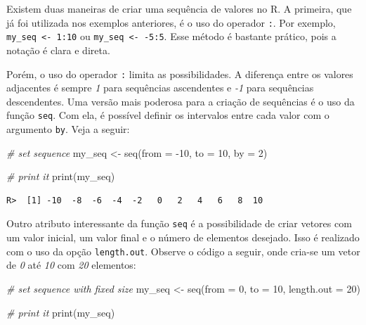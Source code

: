 \documentclass[
  11pt,
]{book}
\newenvironment{Shaded}{\begin{snugshade}}{\end{snugshade}}
\newcommand{\AttributeTok}[1]{\textcolor[rgb]{0.61,0.61,0.61}{#1}}
\newcommand{\CommentTok}[1]{\textcolor[rgb]{0.37,0.37,0.37}{\textit{#1}}}
\newcommand{\DecValTok}[1]{\textcolor[rgb]{0.06,0.06,0.06}{#1}}
\newcommand{\FunctionTok}[1]{\textcolor[rgb]{0,0,0}{#1}}
\newcommand{\NormalTok}[1]{#1}
\newcommand{\OtherTok}[1]{\textcolor[rgb]{0.37,0.37,0.37}{#1}}
\newcommand{\SpecialCharTok}[1]{\textcolor[rgb]{0,0,0}{#1}}
\begin{document}
Existem duas maneiras de criar uma sequência de valores no R. A primeira, que já foi utilizada nos exemplos anteriores, é o uso do operador \texttt{:}. Por exemplo, \texttt{my\_seq\ \textless{}-\ 1:10} ou \texttt{my\_seq\ \textless{}-\ -5:5}. Esse método é bastante prático, pois a notação é clara e direta.

Porém, o uso do operador \texttt{:} limita as possibilidades. A diferença entre os valores adjacentes é sempre \emph{1} para sequências ascendentes e \emph{-1} para sequências descendentes. Uma versão mais poderosa para a criação de sequências é o uso da função \texttt{seq}. Com ela, é possível definir os intervalos entre cada valor com o argumento \texttt{by}. Veja a seguir: 

\begin{Shaded}
\begin{Highlighting}[]
\CommentTok{\# set sequence}
\NormalTok{my\_seq }\OtherTok{\textless{}{-}} \FunctionTok{seq}\NormalTok{(}\AttributeTok{from =} \SpecialCharTok{{-}}\DecValTok{10}\NormalTok{, }\AttributeTok{to =} \DecValTok{10}\NormalTok{, }\AttributeTok{by =} \DecValTok{2}\NormalTok{)}

\CommentTok{\# print it}
\FunctionTok{print}\NormalTok{(my\_seq)}
\end{Highlighting}
\end{Shaded}

\begin{verbatim}
R>  [1] -10  -8  -6  -4  -2   0   2   4   6   8  10
\end{verbatim}

Outro atributo interessante da função \texttt{seq} é a possibilidade de criar vetores com um valor inicial, um valor final e o número de elementos desejado. Isso é realizado com o uso da opção \texttt{length.out}. Observe o código a seguir, onde cria-se um vetor de \emph{0} até \emph{10} com \emph{20} elementos:

\begin{Shaded}
\begin{Highlighting}[]
\CommentTok{\# set sequence with fixed size}
\NormalTok{my\_seq }\OtherTok{\textless{}{-}} \FunctionTok{seq}\NormalTok{(}\AttributeTok{from =} \DecValTok{0}\NormalTok{, }\AttributeTok{to =} \DecValTok{10}\NormalTok{, }\AttributeTok{length.out =} \DecValTok{20}\NormalTok{)}

\CommentTok{\# print it}
\FunctionTok{print}\NormalTok{(my\_seq)}
\end{Highlighting}
\end{Shaded}
\end{document}
